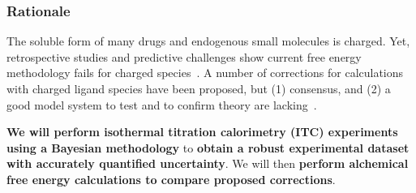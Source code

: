 \documentclass[10pt,final]{article}
\begin{document}
\subsubsection*{Rationale}
The soluble form of many drugs and endogenous small molecules is charged. Yet, retrospective studies and predictive challenges show current free energy methodology fails for charged species~\cite{Rocklin2013b,Muddana2014a}. %
A number of corrections for calculations with charged ligand species %
have been proposed, but (1) consensus, and (2) a good model system to test and to confirm theory are lacking~\cite{Reif2013a, Rocklin2013a, Lin2014a}.

 \textbf{We will perform isothermal titration calorimetry (ITC) experiments  using a Bayesian methodology} to \textbf{obtain a robust experimental dataset with accurately quantified uncertainty}. %
  We will then \textbf{ perform alchemical free energy calculations to compare proposed corrections}.
\end{document}
